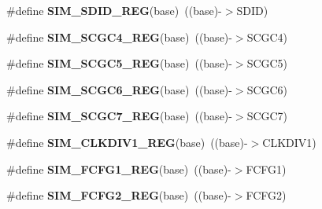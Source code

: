 \begin{DoxyCompactItemize}
\item 
\mbox{\label{group___s_i_m___register___accessor___macros_ga3ce5dc30bb52a91ee8b83b564ebc8f11}} 
\#define {\bfseries S\+I\+M\+\_\+\+S\+D\+I\+D\+\_\+\+R\+EG}(base)~((base)-\/$>$S\+D\+ID)
\item 
\mbox{\label{group___s_i_m___register___accessor___macros_ga38eed3f9464ac97fb6dd04184291c220}} 
\#define {\bfseries S\+I\+M\+\_\+\+S\+C\+G\+C4\+\_\+\+R\+EG}(base)~((base)-\/$>$S\+C\+G\+C4)
\item 
\mbox{\label{group___s_i_m___register___accessor___macros_gacbcf62e33427e5aabbfe947adf619d25}} 
\#define {\bfseries S\+I\+M\+\_\+\+S\+C\+G\+C5\+\_\+\+R\+EG}(base)~((base)-\/$>$S\+C\+G\+C5)
\item 
\mbox{\label{group___s_i_m___register___accessor___macros_ga575def69d6a2257a1b2014c3c2fcae54}} 
\#define {\bfseries S\+I\+M\+\_\+\+S\+C\+G\+C6\+\_\+\+R\+EG}(base)~((base)-\/$>$S\+C\+G\+C6)
\item 
\mbox{\label{group___s_i_m___register___accessor___macros_gace178bd787df5cdde63669fb795a84d5}} 
\#define {\bfseries S\+I\+M\+\_\+\+S\+C\+G\+C7\+\_\+\+R\+EG}(base)~((base)-\/$>$S\+C\+G\+C7)
\item 
\mbox{\label{group___s_i_m___register___accessor___macros_gaa05276138d6ba426d9977f62fa12d659}} 
\#define {\bfseries S\+I\+M\+\_\+\+C\+L\+K\+D\+I\+V1\+\_\+\+R\+EG}(base)~((base)-\/$>$C\+L\+K\+D\+I\+V1)
\item 
\mbox{\label{group___s_i_m___register___accessor___macros_gaa218fdd61f5d04088d7fa1cbec4ba9a9}} 
\#define {\bfseries S\+I\+M\+\_\+\+F\+C\+F\+G1\+\_\+\+R\+EG}(base)~((base)-\/$>$F\+C\+F\+G1)
\item 
\mbox{\label{group___s_i_m___register___accessor___macros_ga28d588cd36812f942a01c0ee0ad1beb0}} 
\#define {\bfseries S\+I\+M\+\_\+\+F\+C\+F\+G2\+\_\+\+R\+EG}(base)~((base)-\/$>$F\+C\+F\+G2)

\end{DoxyCompactItemize}

